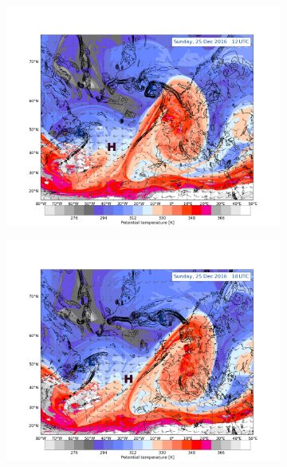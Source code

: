 \begin{figure}[ht!]%
	\centering
	\begin{subfigure}[b]{0.49\textwidth}
		\includegraphics[trim={4.2cm 0cm 4.3cm 5.1cm},clip,
		width=\textwidth]{./fig_DynTropo/20161225_12}
		\caption{} \label{fig:DT25}
	\end{subfigure}
	\begin{subfigure}[b]{0.49\textwidth}
		\includegraphics[trim={4.2cm 0cm 4.3cm 5.1cm},clip,
		width=\textwidth]{./fig_DynTropo/20161225_18}
		\caption{} \label{fig:DT25_18}
	\end{subfigure}

\end{figure}

